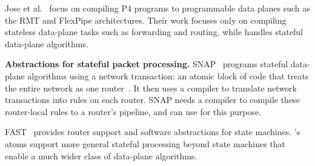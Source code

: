 Jose et al.~\cite{lavanya_compiler} focus on compiling P4 programs to
programmable data planes such as the RMT and FlexPipe architectures. Their work
focuses only on compiling stateless data-plane tasks such as forwarding and
routing, while \pktlanguage handles stateful data-plane algorithms.

\medskip
\noindent
\textbf{Abstractions for stateful packet processing.}
SNAP~\cite{snap} programs stateful data-plane algorithms using a network
transaction: an atomic block of code that treats the entire network as one
router~\cite{onebigrouter}. It then uses a compiler to translate network
transactions into rules on each router. SNAP needs a compiler to compile
these router-local rules to a router's pipeline, and can use \pktlanguage for
this purpose.

FAST~\cite{fast} provides router
support and software abstractions for state machines. \absmachine's atoms
support more general stateful processing beyond state machines that enable a
much wider class of data-plane algorithms.
